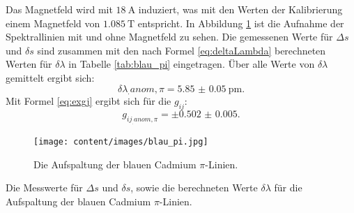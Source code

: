 Das Magnetfeld wird mit $\SI{18}{\ampere}$ induziert, was mit den Werten der Kalibrierung einem Magnetfeld von $\SI{1.085}{\tesla}$ entspricht. In Abbildung \ref{fig:blau_pi} ist die Aufnahme der Spektrallinien mit und ohne Magnetfeld zu sehen. Die gemessenen Werte für $\Delta s$ und $\delta s$ sind zusammen mit den nach Formel \eqref{eq:deltaLambda} berechneten Werten für $\delta\lambda$ in Tabelle \ref{tab:blau_pi} eingetragen.
Über alle Werte von $\delta\lambda$ gemittelt ergibt sich:
\[
\delta\lambda_.{anom,\pi} = \SI{5.85(5)}{\pico\metre}\text{.}
\]
Mit Formel \eqref{eq:exgj} ergibt sich für die $g_{ij}$:
\[
g_{ij_.{anom,\pi}} = \pm\num{0.502(5)}\text{.}
\]

\begin{figure}
	\centering
	\texttt{[image: content/images/blau\_pi.jpg]}
	\caption{Die Aufspaltung der blauen Cadmium $\pi$-Linien.}
	\label{fig:blau_pi}
\end{figure}

\begin{table}
	\centering
	\caption{Die Messwerte für $\Delta s$ und $\delta s$, sowie die berechneten Werte $\delta\lambda$ für die Aufspaltung der blauen Cadmium $\pi$-Linien.}
	
	\label{tab:blau_pi}
\end{table}